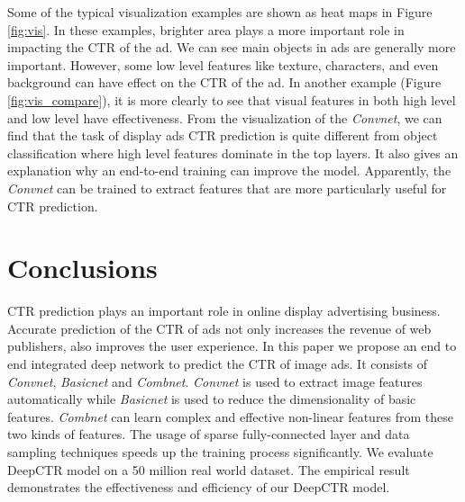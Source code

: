 \documentclass{sig-alternate}
\begin{document}
Some of the typical visualization examples are shown as heat maps  in Figure \ref{fig:vis}. In  these examples, brighter area plays a more important role in impacting the CTR of the ad. We can see main objects in ads are generally more important. However,  some low level features like texture, characters, and even background can have effect on the CTR of the ad. In another example (Figure \ref{fig:vis_compare}), it is more clearly to see that visual features in both high level and low level have effectiveness. From the visualization of the \emph{Convnet}, we can find that  the task of display ads CTR prediction is quite different from object classification where high level features dominate in the top layers.  It  also   gives an explanation why an end-to-end training can improve the model. Apparently, the \emph{Convnet} can be trained to extract features that are more particularly useful for CTR prediction.
\section{Conclusions}
CTR prediction plays an important role in online display advertising business. Accurate prediction of the CTR of ads not only increases the revenue of web publishers, also improves the user experience. In this paper we propose an end to end integrated deep network to predict the CTR of image ads.  It consists of \emph{Convnet}, \emph{Basicnet} and \emph{Combnet}. \emph{Convnet} is used to extract image features automatically while \emph{Basicnet} is used to reduce the dimensionality of basic features. \emph{Combnet} can learn complex and effective non-linear features from these two kinds of  features. The usage of sparse fully-connected layer and data sampling techniques speeds up the training process significantly.
We evaluate DeepCTR model on a 50 million real world dataset. The empirical result demonstrates 
the effectiveness and efficiency of our DeepCTR model. 



%

%
\end{document}
